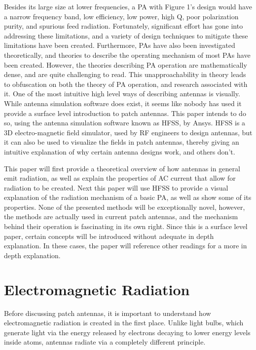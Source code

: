 \documentclass[12pt]{article}
\begin{document}
Besides its large size at lower frequencies, a PA with Figure 1's design would have a narrow frequency band, low efficiency, low power, high Q, poor polarization purity, and spurious feed radiation\cite{balanis2016antenna}. Fortunately, significant effort has gone into addressing these limitations, and a variety of design techniques to mitigate these limitations have been created\cite{balanis2016antenna}. Furthermore, PAs have also been investigated theoretically, and theories to describe the operating mechanism of most PAs have been created. However, the theories describing PA operation are mathematically dense, and are quite challenging to read. This unapproachability in theory leads to obfuscation on both the theory of PA operation, and research associated with it. One of the most intuitive high level ways of describing antennas is visually. While antenna simulation software does exist, it seems like nobody has used it provide a surface level introduction to patch antennas. This paper intends to do so, using the antenna simulation software known as HFSS, by Ansys. HFSS is a 3D electro-magnetic field simulator, used by RF engineers to design antennas, but it can also be used to visualize the fields in patch antennas, thereby giving an intuitive explanation of why certain antenna designs work, and others don't.

This paper will first provide a theoretical overview of how antennas in general emit radiation, as well as explain the properties of AC current that allow for radiation to be created. Next this paper will use HFSS to provide a visual explanation of the radiation mechanism of a basic PA, as well as show some of its properties. None of the presented methods will be exceptionally novel, however, the methods are actually used in current patch antennas, and the mechanism behind their operation is fascinating in its own right. Since this is a surface level paper, certain concepts will be introduced without adequate in depth explanation. In these cases, the paper will reference other readings for a more in depth explanation.            
  
\section{Electromagnetic Radiation}  

Before discussing patch antennas, it is important to understand how electromagnetic radiation is created in the first place. Unlike light bulbs, which generate light via the energy released by electrons decaying to lower energy levels inside atoms, antennas radiate via a completely different principle.
\end{document}
